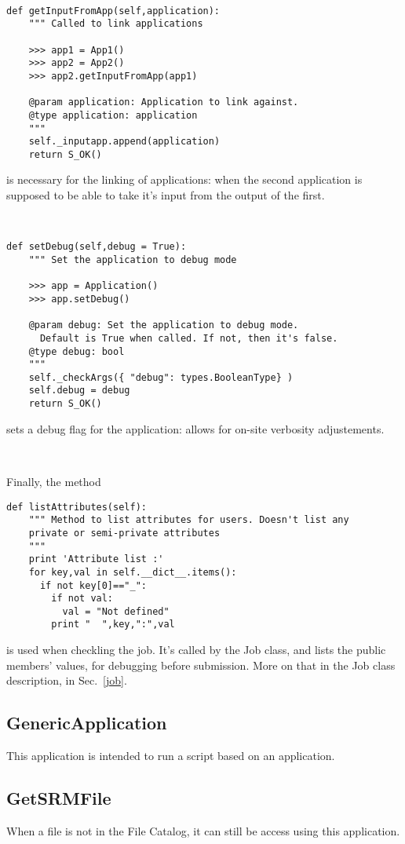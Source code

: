 \documentclass[a4paper,12pt]{article}
\begin{document}
~

\begin{lstlisting}[firstnumber=248]  
  def getInputFromApp(self,application):
    """ Called to link applications
    
    >>> app1 = App1()
    >>> app2 = App2()
    >>> app2.getInputFromApp(app1)
    
    @param application: Application to link against.
    @type application: application
    """
    self._inputapp.append(application)
    return S_OK()  
\end{lstlisting}
is necessary for the linking of applications: when the second application is
supposed to be able to take it's input from the output of the first.

~

\begin{lstlisting}[firstnumber=261]  
  def setDebug(self,debug = True):
    """ Set the application to debug mode
    
    >>> app = Application()
    >>> app.setDebug()
    
    @param debug: Set the application to debug mode. 
      Default is True when called. If not, then it's false.
    @type debug: bool
    """
    self._checkArgs({ "debug": types.BooleanType} )
    self.debug = debug
    return S_OK()
\end{lstlisting}
sets a debug flag for the application: allows for on-site verbosity
adjustements.

~

Finally, the method 
\begin{lstlisting}[firstnumber=274]  
  def listAttributes(self):
    """ Method to list attributes for users. Doesn't list any 
    private or semi-private attributes
    """
    print 'Attribute list :'
    for key,val in self.__dict__.items():
      if not key[0]=="_":
        if not val:
          val = "Not defined"
        print "  ",key,":",val
\end{lstlisting}
is used when checkling the job. It's called by the Job class, and lists the
public members' values, for debugging before submission. More on that in the Job
class description, in Sec.~\ref{job}.

\subsection{GenericApplication}\label{genericapp}
This application is intended to run a script based on an application. 

\subsection{GetSRMFile}\label{getsrmfile}
When a file is not in the File Catalog, it can still be access using this
application.
\end{document}
